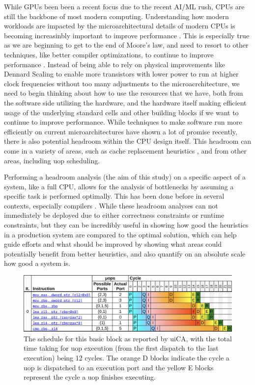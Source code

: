 \documentclass[sigconf]{acmart}
\begin{document}
While GPUs been been a recent focus due to the recent AI/ML rush, CPUs are still the backbone of most
modern computing. Understanding how modern workloads are impacted by the microarchitectural details of
modern CPUs is becoming increasinbly important to improve performance \cite{moseley2015warehouseprofiling}.
This is especially true as we are beginning to get to the end of Moore's law, and need to resort to other
techniques, like better compiler optimizations, to continue to improve performance \cite{lattner2020mlir}.
Instead of being able to rely on physical improvements like Dennard Scaling to enable more transistors with lower
power to run at higher clock frequencies without too many adjustments to the microacrchitecture, we need to begin
thinking about how to use the resources that we have, both from the software side utilizing the hardware, and the
hardware itself making efficient usage of the underlying standard cells and other building blocks if we want
to continue to improve performance.
While techniques to make software run more efficiently on current microarchitectures have shown a lot of
promise recently, there is also potential headroom within the CPU design
itself. This headroom can come in a variety of areas, such as cache replacement heuristics \cite{moseley2023emissary},
and from other areas, including uop scheduling.

Performing a headroom analysis (the aim of this study) on a specific aspect of a system, like a full CPU, allows
for the analysis of bottlenecks by assuming a specific task is performed optimally. This has been done before in
several contexts, especially compilers \cite{doerfert2023oraql} \cite{lozano2019combinatorialregalloc}. While these
headroom analyses can not immediately be deployed due to either correctness constraints or runtime constraints,
but they can be incredibly useful in showing how good the heuristics in a production system are compared to the
optimal solution, which can help guide efforts and what should be improved by showing what areas could potentially
benefit from better heuristics, and also quantify on an absolute scale how good a system is.

\begin{figure}[t]
  \centering
  \includegraphics[width=\linewidth]{uica_trace.png}
  \caption{The schedule for this basic block as reported by uiCA, with the total time taking for uop execution (from the first
  dispatch to the last execution) being 12 cycles. The orange D blocks indicate the cycle a uop is dispatched to an execution
  port and the yellow E blocks represent the cycle a uop finishes executing.}
  \label{figure:uica-trace}
\end{figure}
\end{document}
